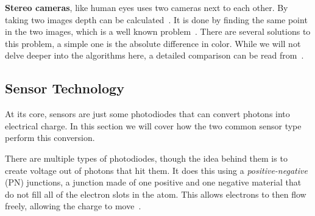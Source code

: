 \textbf{Stereo cameras}, like human eyes uses two cameras next to each other.
By taking two images depth can be calculated~\cite{adi2017distance}. It is done
by finding the same point in the two images, which is a well known problem~\cite{scharstein2002taxonomy}.
There are several solutions to this problem,
a simple one is the absolute difference in color. While we will not delve
deeper into the algorithms here, a detailed comparison can be read from~\cite{scharstein2002taxonomy}.

\subsection{Sensor Technology}\label{section:sensortechnology}
At its core, sensors are just some photodiodes that can convert photons into
electrical charge. In this section we will cover how the two common sensor type
perform this conversion.

There are multiple types of photodiodes, though the idea behind them is to
create voltage out of photons that hit them. It does this using a
\textit{positive-negative} (PN) junctions, a junction made of one positive and
one negative material that do not fill all of the electron slots in the atom.
This allows electrons to then flow freely, allowing the charge to
move~\cite{peterson2001works}.

\begin{figure}
    \centering
    \caption{}
\end{figure}

